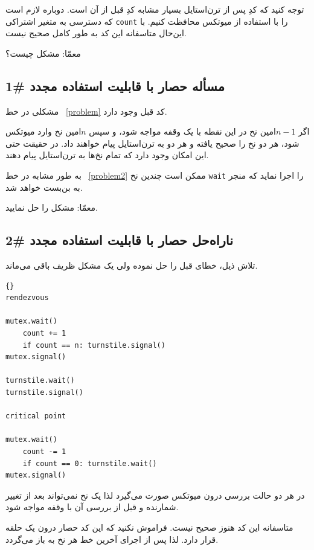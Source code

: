 \documentclass{book}
\newcommand{\clearemptydoublepage}{}%
\begin{document}
    توجه کنید که کدِ پس از تر‌ن‌استایل بسیار مشابه کدِ قبل از آن است. دوباره لازم است که دسترسی به متغیر اشتراکی \texttt{count} را 
    با استفاده از میوتکس محافظت کنیم. با این‌حال متاسفانه این کد به طور کامل صحیح نیست. 

    معمّا: مشکل چیست؟


\clearemptydoublepage
\subsection{ مسأله حصار با قابلیت استفاده مجدد  \#1}

  مشکلی در خط ~\ref{problem} کد قبل وجود دارد. 

    اگر $n-1$امین نخ در این نقطه با یک وقفه مواجه شود، و سپس $n$امین نخ وارد میوتکس شود، هر دو نخ  
    را صحیح یافته و هر دو به ترن‌استایل پیام خواهند داد. در حقیقت حتی این امکان وجود دارد که تمام نخ‌ها به ترن‌استایل پیام دهند. 

    به طور مشابه در خط ~\ref{problem2} ممکن است چندین نخ \texttt{wait}  را اجرا نماید که منجر به بن‌بست خواهد شد. 

    معمّا: مشکل را حل نمایید. 

\clearemptydoublepage
\subsection {  ناراه‌حل حصار با قابلیت استفاده مجدد \#2}

    تلاش ذیل، خطای قبل را حل نموده ولی یک مشکل ظریف باقی می‌ماند. 

\begin{latin}
\begin{lstlisting}[title=\rl{ ناراه‌حل حصار با قابلیت استفاده مجدد}]{} 
rendezvous

mutex.wait()
    count += 1
    if count == n: turnstile.signal()
mutex.signal()

turnstile.wait()
turnstile.signal()

critical point

mutex.wait()
    count -= 1
    if count == 0: turnstile.wait()
mutex.signal()
\end{lstlisting}
\end{latin}

    در هر دو حالت بررسی درون میوتکس صورت می‌گیرد لذا یک نخ نمی‌تواند بعد از تغییر شمارنده و قبل از بررسی آن با وقفه مواجه شود. 

    متاسفانه این کد هنوز صحیح نیست. فراموش نکنید که این کد حصار درون یک حلقه قرار دارد. لذا پس از اجرای آخرین خط 
    هر نخ به  باز می‌گردد. 
\end{document}
